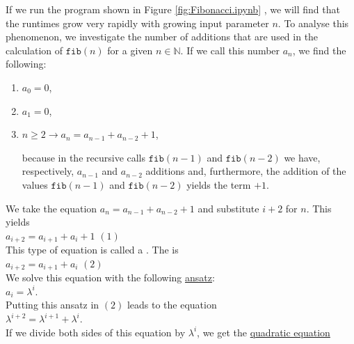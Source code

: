 If we run the program shown in Figure \ref{fig:Fibonacci.ipynb} , we will find that the runtimes grow very rapidly with
growing input parameter $n$.  To analyse this phenomenon, we investigate the number of additions that are used in the
calculation of $\texttt{fib}(n)$ for a given $n \in \mathbb{N}$.  If we call this number $a_n$, we find
the following:
\begin{enumerate}
\item $a_0 = 0$,
\item $a_1 = 0$,
\item $n \geq 2 \rightarrow a_n = a_{n-1} + a_{n-2} + 1$,

      because in the recursive calls $\texttt{fib}(n-1)$ and $\texttt{fib}(n-2)$ we have, respectively, 
      $a_{n-1}$ and $a_{n-2}$ additions and, furthermore, the addition of the values
      $\texttt{fib}(n-1)$ and $\texttt{fib}(n-2)$ yields the term $+1$.
\end{enumerate}
We take the equation $a_n = a_{n-1} + a_{n-2} + 1$ and substitute $i+2$ for $n$.  This yields
\\[0.2cm]
\hspace*{1.3cm} $a_{i+2} = a_{i+1} + a_i + 1$ \hspace*{\fill} $(1)$
\\[0.2cm]
This type of equation is called a .
The   is
\\[0.2cm]
\hspace*{1.3cm}
$a_{i+2} = a_{i+1} + a_i$ \hspace*{\fill} $(2)$
\\[0.2cm]
We solve this equation with the following \href{https://en.oxforddictionaries.com/definition/ansatz}{ansatz}:
\\[0.2cm]
\hspace*{1.3cm} $a_i = \lambda^i$. \\[0.2cm]
Putting this ansatz in $(2)$ leads to the equation 
\\[0.2cm]
\hspace*{1.3cm}
$\lambda^{i+2} = \lambda^{i+1} + \lambda^i$.
\\[0.2cm]
If we divide both sides of this equation by $\lambda^i$, we get the
\href{https://en.wikipedia.org/wiki/Quadratic_equation}{quadratic equation}
\\[0.2cm]
\hspace*{1.3cm}
